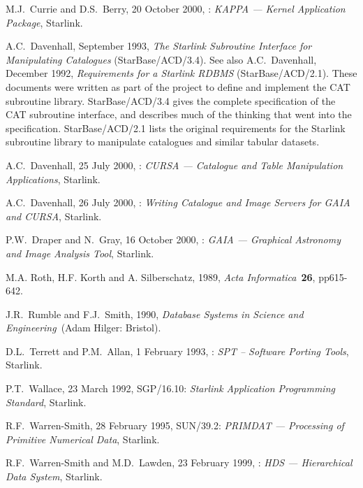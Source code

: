 \documentclass[11pt,twoside]{starlink}
\begin{document}
% 

\newpage
{}
\begin{thebibliography}{99}

   M.J.~Currie and D.S.~Berry, 20 October 2000,
   : \textit{KAPPA --- Kernel Application Package},
    Starlink.

   A.C.~Davenhall, September 1993, \textit{The Starlink
   Subroutine Interface for Manipulating Catalogues}\/ (StarBase/ACD/3.4).
   See also A.C.~Davenhall, December 1992, \textit{Requirements for a
   Starlink RDBMS}\/ (StarBase/ACD/2.1).
   These documents were written as part of the project to define
   and implement the CAT subroutine library.  StarBase/ACD/3.4 gives the
   complete specification of the CAT subroutine interface, and describes
   much of the thinking that went into the specification.
   StarBase/ACD/2.1 lists the original requirements for the Starlink
   subroutine library to manipulate catalogues and similar tabular
   datasets.

   A.C.~Davenhall, 25 July 2000,
   : \textit{CURSA --- Catalogue and Table
    Manipulation Applications}, Starlink.

   A.C.~Davenhall, 26 July 2000,
   : \textit{Writing Catalogue and Image Servers for
   GAIA and CURSA}, Starlink.

   P.W.~Draper and N.~Gray, 16 October 2000,
   : \textit{GAIA --- Graphical Astronomy and
   Image Analysis Tool}, Starlink.

   M.A. Roth, H.F. Korth and A. Silberschatz, 1989, \textit{Acta Informatica}\, \textbf{26}, pp615-642.

   J.R.~Rumble and F.J.~Smith, 1990, \textit{Database
   Systems in Science and Engineering}\, (Adam Hilger: Bristol).

   D.L.~Terrett and P.M.~Allan, 1 February 1993,
   : \textit{SPT -- Software Porting Tools},
   Starlink.

   P.T.~Wallace, 23 March 1992, SGP/16.10: \textit{Starlink Application Programming Standard}, Starlink.

   R.F.~Warren-Smith, 28 February 1995,
   SUN/39.2: \textit{PRIMDAT --- Processing of Primitive Numerical Data},
   Starlink.

   R.F.~Warren-Smith and M.D.~Lawden, 23 February 1999,
   : \textit{HDS --- Hierarchical Data System},
   Starlink.

\end{thebibliography}

\typeout{  }
\typeout{*****************************************************}
\typeout{  }
\typeout{  }
\typeout{*****************************************************}
\typeout{  }
\end{document}
